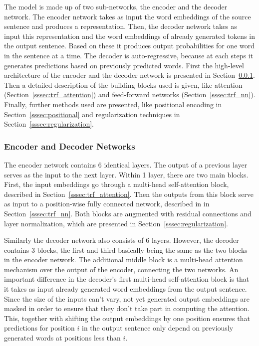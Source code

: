 \documentclass[12pt]{article}
\begin{document}
The model is made up of two sub-networks, the encoder and the decoder network. The encoder network takes as input the word embeddings of the source sentence and produces a representation. Then, the decoder network takes as input this representation and the word embeddings of already generated tokens in the output sentence. Based on these it produces output probabilities for one word in the sentence at a time. The decoder is auto-regressive, because at each steps it generates predictions based on previously predicted words. First the high-level architecture of the encoder and the decoder network is presented in Section~\ref{sssec:encdec}. Then a detailed description of the building blocks used is given, like attention (Section~\ref{sssec:trf_attention}) and feed-forward networks (Section~\ref{sssec:trf_nn}). Finally, further methods used are presented, like positional encoding in Section~\ref{sssec:positional} and regularization techniques in Section~\ref{sssec:regularization}.

\subsubsection{Encoder and Decoder Networks} \label{sssec:encdec}
The encoder network contains 6 identical layers. The output of a previous layer serves as the input to the next layer. Within 1 layer, there are two main blocks. First, the input embeddings go through a multi-head self-attention block, described in Section~\ref{sssec:trf_attention}. Then the outputs from this block serve as input to a position-wise fully connected network, described in in Section~\ref{sssec:trf_nn}. Both blocks are augmented with residual connections and layer normalization, which are presented in Section~\ref{sssec:regularization}.

Similarly the decoder network also consists of 6 layers. However, the decoder contains 3 blocks, the first and third basically being the same as the two blocks in the encoder network. The additional middle block is a multi-head attention mechanism over the output of the encoder, connecting the two networks. An important difference in the decoder's first multi-head self-attention block is that it takes as input already generated word embeddings from the output sentence. Since the size of the inputs can't vary, not yet generated output embeddings are masked in order to ensure that they don't take part in computing the attention. This, together with shifting the output embeddings by one position ensures that predictions for position \(i\) in the output sentence only depend on previously generated words at positions less than \(i\).
\end{document}
